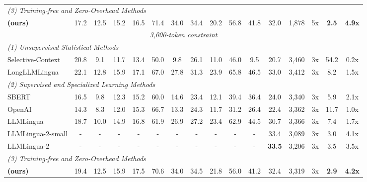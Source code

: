 \documentclass[11pt]{article}
\newcommand{\ours}{\text{BEAVER}\xspace}
\begin{document}
\begin{table}[t]
{\begin{tabular}{l | cccccccccc >{\columncolor{lightgray}}c | cc | cc}
            \midrule
            \multicolumn{16}{l}{\textit{(3) Training-free and Zero-Overhead Methods}} \\
            \rowcolor{blue!5} 
            \textbf{\ours (ours)} & 17.2 & 12.5 & 15.2 & 16.5 & 71.4 & 34.0 & 34.4 & 20.2 & 56.8 & 41.8 & 32.0 & 1,878 & 5x & \textbf{2.5} & \textbf{4.9x} \\

            \midrule
            \hline
            
            \multicolumn{16}{c}{\textit{3,000-token constraint}} \\
            \hline

            \multicolumn{16}{l}{\textit{(1) Unsupervised Statistical Methods}} \\
            Selective-Context & 20.8 & 9.1 & 11.7 & 13.4 & 50.0 & 9.8 & 26.1 & 11.0 & 46.0 & 9.5 & 20.7 & 3,460 & 3x & 54.2 & 0.2x \\
            LongLLMLingua     & 22.1 & 12.8 & 15.9 & 17.1 & 67.0 & 27.8 & 31.3 & 23.9 & 65.8 & 46.5 & 33.0 & 3,412 & 3x & 8.2 & 1.5x \\
            
            \midrule
            \multicolumn{16}{l}{\textit{(2) Supervised and Specialized Learning Methods}} \\
            SBERT             & 16.5 & 9.8 & 12.3 & 15.2 & 60.0 & 14.6 & 23.4 & 12.1 & 39.4 & 36.4 & 24.0 & 3,340 & 3x & 5.9 & 2.1x \\
            OpenAI            & 14.3 & 8.3 & 12.0 & 15.3 & 66.7 & 13.3 & 24.3 & 11.7 & 31.2 & 26.4 & 22.4 & 3,362 & 3x & 11.7 & 1.0x \\
            LLMLingua         & 18.7 & 10.0 & 14.9 & 16.8 & 61.9 & 26.9 & 27.2 & 23.4 & 62.9 & 44.5 & 30.7 & 3,366 & 3x & 7.4 & 1.7x \\
            LLMLingua-2-small & - & - & - & - & - & - & - & - & - & - & \underline{33.4} & 3,089 & 3x & \underline{3.0} & \underline{4.1x} \\
            LLMLingua-2       & - & - & - & - & - & - & - & - & - & - & \textbf{33.5} & 3,206 & 3x & 3.5 & 3.5x \\
            
            \midrule
            \multicolumn{16}{l}{\textit{(3) Training-free and Zero-Overhead Methods}} \\
            \rowcolor{blue!5}
            \textbf{\ours (ours)} & 19.4 & 12.5 & 15.9 & 17.5 & 70.6 & 34.0 & 34.5 & 21.8 & 56.0 & 41.2 & 32.4 & 3,319 & 3x & \textbf{2.9} & \textbf{4.2x} \\


\end{tabular}}
\end{table}
\end{document}
